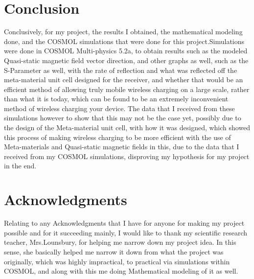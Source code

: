 \documentclass[]{article}
\begin{document}
\section{Conclusion}
Conclusively, for my project, the results I obtained, the mathematical modeling done, and the COSMOL simulations that were done for this project.Simulations were done in COSMOL Multi-physics 5.2a, to obtain results such as the modeled Quasi-static magnetic field vector direction, and other graphs as well, such as the S-Parameter as well, with the rate of reflection and what was reflected off the meta-material unit cell designed for the receiver, and whether that would be an efficient method of allowing truly mobile wireless charging on a large scale, rather than what it is today, which can be found to be an extremely inconvenient method of wireless charging your device. The data that I received from these simulations however to show that this may not be the case yet, possibly due to the design of the Meta-material unit cell, with how it was designed, which showed this process of making wireless charging to be more efficient with the use of Meta-materials and Quasi-static magnetic fields in this, due to the data that I received from my COSMOL simulations, disproving my hypothesis for my project in the end.
\section{Acknowledgments}
Relating to any Acknowledgments that I have for anyone for making my project possible and for it succeeding mainly, I would like to thank my scientific research teacher, Mrs.Lounsbury, for helping me narrow down my project idea. In this sense, she basically helped me narrow it down from what the project was originally, which was highly impractical, to practical via simulations within COSMOL, and along with this me doing Mathematical modeling of it as well. 
\end{document}
